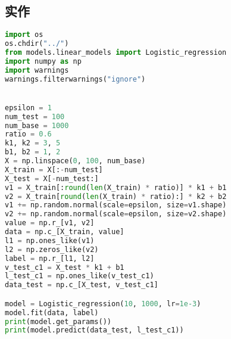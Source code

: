 \documentclass{report}
\begin{document}
\subsection{实作}
\begin{lstlisting}[language={python}]
import os
os.chdir("../")
from models.linear_models import Logistic_regression
import numpy as np
import warnings
warnings.filterwarnings("ignore")


epsilon = 1
num_test = 100
num_base = 1000
ratio = 0.6
k1, k2 = 3, 5
b1, b2 = 1, 2
X = np.linspace(0, 100, num_base)
X_train = X[:-num_test]
X_test = X[-num_test:]
v1 = X_train[:round(len(X_train) * ratio)] * k1 + b1
v2 = X_train[round(len(X_train) * ratio):] * k2 + b2
v1 += np.random.normal(scale=epsilon, size=v1.shape)
v2 += np.random.normal(scale=epsilon, size=v2.shape)
value = np.r_[v1, v2]
data = np.c_[X_train, value]
l1 = np.ones_like(v1)
l2 = np.zeros_like(v2)
label = np.r_[l1, l2]
v_test_c1 = X_test * k1 + b1
l_test_c1 = np.ones_like(v_test_c1)
data_test = np.c_[X_test, v_test_c1]

model = Logistic_regression(10, 1000, lr=1e-3)
model.fit(data, label)
print(model.get_params())
print(model.predict(data_test, l_test_c1))
\end{lstlisting}
\end{document}
